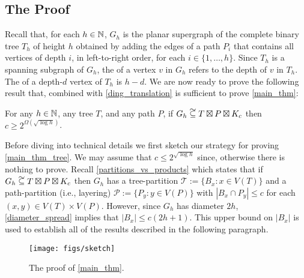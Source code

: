\documentclass{patmorin}
\newcommand\subsetcong{\mathrel{\text{%
    \setbox0\hbox{$\subseteq$}%
    \rlap{\hbox to \wd0{\hss\hss\hss\raisebox{1.5\height}{$\sim$}\hss}}\box0
}}}
\renewcommand{\le}{\leqslant}
\renewcommand{\ge}{\geqslant}
\begin{document}
\subsection{The Proof}

Recall that, for each $h\in\mathbb{N}$, $G_{h}$ is the planar supergraph of the complete binary tree $T_h$ of height $h$ obtained by adding the edges of a path $P_i$ that contains all vertices of depth $i$, in left-to-right order, for each $i\in\{1,\ldots,h\}$.   Since $T_h$ is a spanning subgraph of $G_h$, the  of a vertex $v$ in $G_h$ refers to the depth of $v$ in $T_h$.  The  of a depth-$d$ vertex of $T_h$ is $h-d$.
We are now ready to prove the following result that, combined with \cref{ding_translation} is sufficient to prove \cref{main_thm}:

\begin{thm}\label{main_thm_tree}
  For any $h\in\mathbb{N}$, any tree $T$, and any path $P$, if $G_{h}\subsetcong T\boxtimes P\boxtimes K_c$ then $c\ge 2^{\Omega(\sqrt{\log h})}$.
\end{thm}

Before diving into technical details we first sketch our strategy for proving \cref{main_thm_tree}.  We may assume that $c \le 2^{\sqrt{\log h}}$ since, otherwise there is nothing to prove.  Recall \cref{partitions_vs_products} which states that if $G_h\subsetcong T\boxtimes P\boxtimes K_c$ then $G_h$ has a tree-partition $\mathcal{T}:=\{B_x:x\in V(T)\}$ and a path-partition (i.e., layering) $\mathcal{P}:=\{P_y:y\in V(P)\}$ with $|B_x\cap P_y|\le c$ for each $(x,y)\in V(T)\times V(P)$. However, since $G_h$ has diameter $2h$, \cref{diameter_spread} implies that $|B_x|\le c(2h+1)$. This upper bound on $|B_x|$ is used to establish all of the results described in the following paragraph.


\begin{figure}
  \begin{center}
    \texttt{[image: figs/sketch]}
  \end{center}
  \caption{The proof of \cref{main_thm}.}
  \label{sketch}
\end{figure}
\end{document}
